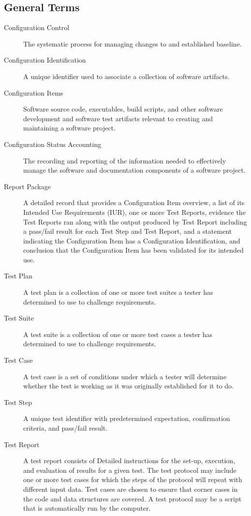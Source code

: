 \subsection{General Terms}
\begin{description}

\item[Configuration Control]  The systematic process for managing changes
  to and established baseline.

\item[Configuration Identification]  A unique identifier used to associate
  a collection of software artifacts.

\item[Configuration Items]  Software source code, executables, build
  scripts, and other software development and software test artifacts relevant
  to creating and maintaining a software project.

\item[Configuration Status Accounting]  The recording and reporting of the
  information needed to effectively manage the software and documentation
  components of a software project.

\item[Report Package]  A detailed record that provides a Configuration
  Item overview, a list of its Intended Use Requirements (IUR), one or more Test
  Reports, evidence the Test Reports ran along with the output produced by
  Test Report including a pass/fail result for each Test Step and Test
  Report, and a statement indicating the Configuration Item has
  a Configuration Identification, and conclusion that the Configuration Item has
  been validated for its intended use.

\item[Test Plan]  A test plan is a collection of one or more test suites
  a tester has determined to use to challenge requirements.

\item[Test Suite]  A test suite is a collection of one or more test cases
  a tester has determined to use to challenge requirements.

\item[Test Case]  A test case is a set of conditions under which a tester
  will determine whether the test is working as it was originally established
  for it to do.

\item[Test Step]  A unique test identifier with predetermined expectation,
  confirmation criteria, and pass/fail result.

\item[Test Report]  A test report consists of Detailed instructions for
  the set-up, execution, and evaluation of results for a given test.  The test
  protocol may include one or more test cases for which the steps of the
  protocol will repeat with different input data. Test cases are chosen to
  ensure that corner cases in the code and data structures are covered. A test
  protocol may be a script that is automatically run by the computer.
\end{description}
